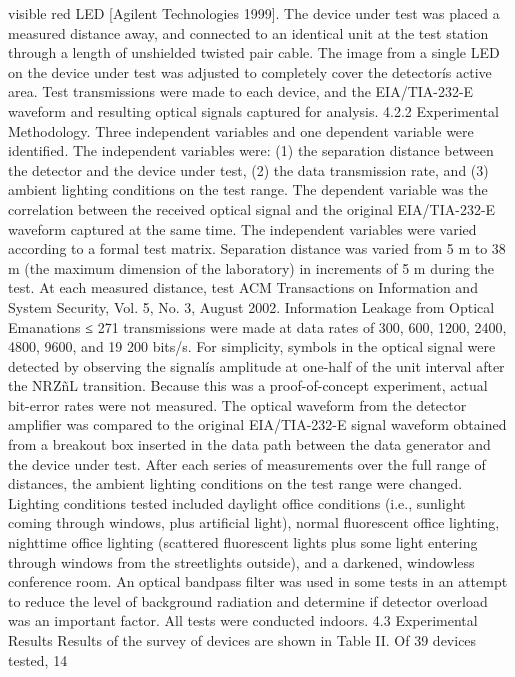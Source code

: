 visible red LED [Agilent Technologies 1999]. 
The device under test was placed a measured distance away, and connected 
to an identical unit at the test station through a length of unshielded twisted 
pair cable. The image from a single LED on the device under test was adjusted 
to completely cover the detectorís active area. Test transmissions were made 
to each device, and the EIA/TIA-232-E waveform and resulting optical signals 
captured for analysis. 
4.2.2 Experimental Methodology. Three independent variables and one 
dependent variable were identified. The independent variables were: (1) the 
separation distance between the detector and the device under test, (2) the data 
transmission rate, and (3) ambient lighting conditions on the test range. The 
dependent variable was the correlation between the received optical signal and 
the original EIA/TIA-232-E waveform captured at the same time. The independent 
variables were varied according to a formal test matrix. Separation 
distance was varied from 5 m to 38 m (the maximum dimension of the laboratory) 
in increments of 5 m during the test. At each measured distance, test 
ACM Transactions on Information and System Security, Vol. 5, No. 3, August 2002.
Information Leakage from Optical Emanations ≤ 271 
transmissions were made at data rates of 300, 600, 1200, 2400, 4800, 9600, and 
19 200 bits/s. 
For simplicity, symbols in the optical signal were detected by observing the 
signalís amplitude at one-half of the unit interval after the NRZñL transition. 
Because this was a proof-of-concept experiment, actual bit-error rates were not 
measured. The optical waveform from the detector amplifier was compared to 
the original EIA/TIA-232-E signal waveform obtained from a breakout box inserted 
in the data path between the data generator and the device under test. 
After each series of measurements over the full range of distances, the ambient 
lighting conditions on the test range were changed. Lighting conditions 
tested included daylight office conditions (i.e., sunlight coming through windows, 
plus artificial light), normal fluorescent office lighting, nighttime office 
lighting (scattered fluorescent lights plus some light entering through windows 
from the streetlights outside), and a darkened, windowless conference room. An 
optical bandpass filter was used in some tests in an attempt to reduce the level 
of background radiation and determine if detector overload was an important 
factor. All tests were conducted indoors. 
4.3 Experimental Results 
Results of the survey of devices are shown in Table II. Of 39 devices tested, 14 
